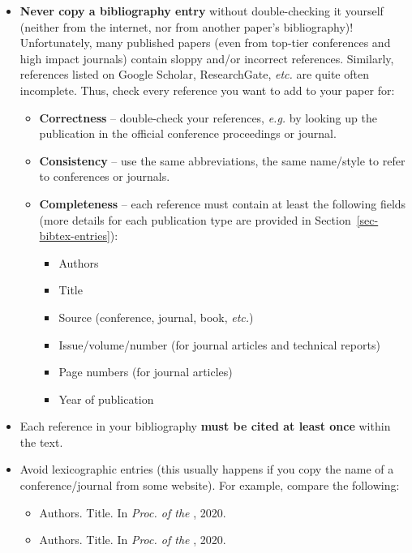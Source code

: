 \documentclass[11pt,a4paper]{article}
\begin{document}
\begin{itemize}
\item \textbf{Never copy a bibliography entry} without double-checking it yourself (neither from the internet, nor from another paper's bibliography)! Unfortunately, many published papers (even from top-tier conferences and high impact journals) contain sloppy and/or incorrect references. Similarly, references listed on Google Scholar, ResearchGate, \emph{etc.} are quite often incomplete. Thus, check every reference you want to add to your paper for:
%
\vspace{-0.25cm}
%
\begin{itemize}
\item \textbf{Correctness} -- double-check your references, \emph{e.g.} by looking up the publication in the official conference proceedings or journal.
\item \textbf{Consistency} -- use the same abbreviations, the same name/style to refer to conferences or journals.
\item \textbf{Completeness} -- each reference must contain at least the following fields (more details for each publication type are provided in Section~\ref{sec-bibtex-entries}):
%
%
\begin{itemize}[label=$\bullet$]
\item Authors
\item Title
\item Source (conference, journal, book, \emph{etc.})
\item Issue/volume/number (for journal articles and technical reports)
\item Page numbers (for journal articles)
\item Year of publication
\end{itemize}
\end{itemize}

\item Each reference in your bibliography \textbf{must be cited at least once} within the text.

\item Avoid lexicographic entries (this usually happens if you copy the name of a conference/journal from some website). For example, compare the following:
%
\vspace{-0.25cm}
%
\begin{itemize}
\item Authors. Title. In \emph{Proc. of the }, 2020.
\item Authors. Title. In \emph{Proc. of the }, 2020.
\end{itemize}


\end{itemize}
\end{document}
